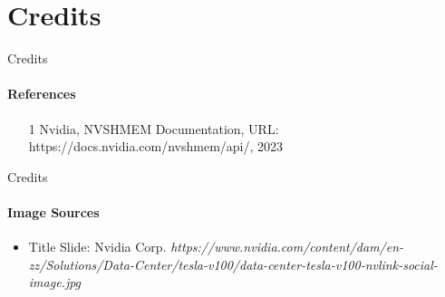 \documentclass[
	ngerman,%
	aspectratio=169,%
	color={accentcolor=8c},
	logo=true,%
	colorframetitle=true,%
    authorontitle=true,
	]{tudabeamer}
\let\code\texttt
\begin{document}
\section{Credits}

\begin{frame}{Credits}
\framesubtitle{References}

\begin{itemize}
    \item [1] Nvidia, NVSHMEM Documentation, URL: https://docs.nvidia.com/nvshmem/api/, 2023
\end{itemize}
    
\end{frame}

\begin{frame}{Credits}
\framesubtitle{Image Sources}

\begin{itemize}
    \item Title Slide: Nvidia Corp. \textit{https://www.nvidia.com/content/dam/en-zz/Solutions/Data-Center/tesla-v100/data-center-tesla-v100-nvlink-social-image.jpg}
\end{itemize}
    
\end{frame}






\end{document}
